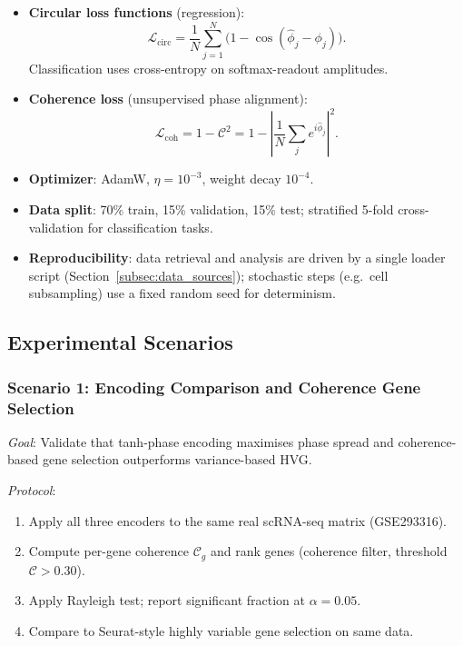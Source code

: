 \documentclass[preprint,12pt,amsmath,amssymb,superscriptaddress,floatfix]{revtex4-2}
\begin{document}
\begin{itemize}
    \item \textbf{Circular loss functions} (regression):
    \begin{equation}
        \mathcal{L}_{\mathrm{circ}} = \frac{1}{N}\sum_{j=1}^N
        \bigl(1 - \cos(\hat\phi_j - \phi_j)\bigr).
    \end{equation}
    Classification uses cross-entropy on softmax-readout amplitudes.

    \item \textbf{Coherence loss} (unsupervised phase alignment):
    \begin{equation}
        \mathcal{L}_{\mathrm{coh}} = 1 - \mathcal{C}^2 = 1 -
        \left|\frac{1}{N}\sum_j e^{i\hat\phi_j}\right|^2.
    \end{equation}

    \item \textbf{Optimizer}: AdamW, $\eta = 10^{-3}$,
    weight decay $10^{-4}$.

    \item \textbf{Data split}: 70\% train, 15\% validation, 15\% test;
    stratified 5-fold cross-validation for classification tasks.

    \item \textbf{Reproducibility}: data retrieval and analysis are driven by
    a single loader script (Section~\ref{subsec:data_sources}); stochastic
    steps (e.g.\ cell subsampling) use a fixed random seed for determinism.
\end{itemize}

\subsection{Experimental Scenarios}
\label{subsec:scenarios}

\subsubsection{Scenario 1: Encoding Comparison and Coherence Gene Selection}

\textit{Goal}: Validate that tanh-phase encoding maximises phase spread
and coherence-based gene selection outperforms variance-based HVG.

\textit{Protocol}:
\begin{enumerate}
    \item Apply all three encoders to the same real scRNA-seq matrix
    (GSE293316).
    \item Compute per-gene coherence $\mathcal{C}_g$ and rank genes
    (coherence filter, threshold $\mathcal{C} > 0.30$).
    \item Apply Rayleigh test; report significant fraction at $\alpha=0.05$.
    \item Compare to Seurat-style highly variable gene selection on same data.
\end{enumerate}
\end{document}
